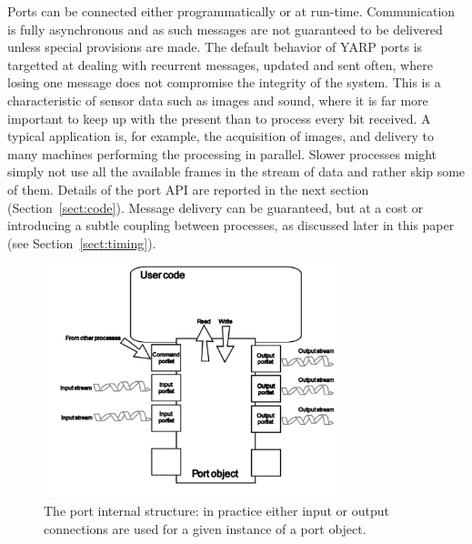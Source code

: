 \noindent
%
Ports can be connected either programmatically or at run-time.
%
%
%
Communication is fully asynchronous and as such messages are not guaranteed to be 
delivered unless special provisions are made. The default behavior of YARP ports 
is targetted at dealing with recurrent messages, updated and sent often, where losing 
one message does not compromise the integrity of the system. This is a characteristic
of sensor data such as images and sound, where it is far more important to keep
up with the present than to process every bit received.  
%
%
A typical application is, for example, the acquisition of images, and delivery to many 
machines performing the processing in parallel. Slower processes might simply not
use all the available frames in the stream of data and rather skip some of them.
%
Details of the port API are reported in the next section (Section~\ref{sect:code}).
Message delivery can be guaranteed, but at a cost or introducing a subtle coupling
between processes, as discussed later in this paper (see Section~\ref{sect:timing}). 


\begin{figure}
	\centering
		\includegraphics[width=8.5cm]{port.eps}
	\caption{The port internal structure: in practice either input or output connections
	are used for a given instance of a port object.}
	\label{fig:port}
\end{figure}


